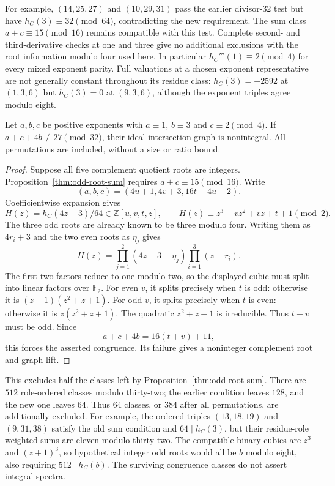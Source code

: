 For example, $(14,25,27)$ and $(10,29,31)$ pass the earlier divisor-$32$
test but have $h_C(3)\equiv32\pmod{64}$, contradicting the new requirement.
The sum class $a+c\equiv15\pmod{16}$ remains compatible with this test.
Complete second- and third-derivative checks at one and three give no
additional exclusions with the root information modulo four used here.
In particular $h_C'''(1)\equiv2\pmod4$ for every mixed exponent parity.
Full valuations at a chosen exponent representative are not generally
constant throughout its residue class: $h_C(3)=-2592$ at $(1,3,6)$ but
$h_C(3)=0$ at $(9,3,6)$, although the exponent triples agree modulo eight.

\begin{proposition}
\label{thm:odd-root-lift}
Let $a,b,c$ be positive exponents with
$a\equiv1$, $b\equiv3$ and $c\equiv2\pmod4$.
If $a+c+4b\not\equiv27\pmod{32}$, their ideal intersection graph is
nonintegral. All permutations are included, without a size or ratio bound.
\end{proposition}

\begin{proof}
Suppose all five complement quotient roots are integers.
Proposition~\ref{thm:odd-root-sum} requires $a+c\equiv15\pmod{16}$.
Write
\[
 (a,b,c)=(4u+1,4v+3,16t-4u-2).
\]
Coefficientwise expansion gives
\[
 H(z)=h_C(4z+3)/64\in\mathbb Z[u,v,t,z],\qquad
 H(z)\equiv z^3+vz^2+vz+t+1\pmod2.
\]
The three odd roots are already known to be three modulo four.
Writing them as $4r_i+3$ and the two even roots as $\eta_j$ gives
\[
 H(z)=\prod_{j=1}^2(4z+3-\eta_j)\prod_{i=1}^3(z-r_i).
\]
The first two factors reduce to one modulo two, so the displayed cubic
must split into linear factors over $\mathbb F_2$.
For even $v$, it splits precisely when $t$ is odd: otherwise it is
$(z+1)(z^2+z+1)$. For odd $v$, it splits precisely when $t$ is even:
otherwise it is $z(z^2+z+1)$. The quadratic $z^2+z+1$ is irreducible.
Thus $t+v$ must be odd. Since
\[
 a+c+4b=16(t+v)+11,
\]
this forces the asserted congruence. Its failure gives a noninteger
complement root and graph lift.
\end{proof}

This excludes half the classes left by Proposition~\ref{thm:odd-root-sum}.
There are $512$ role-ordered classes modulo thirty-two; the earlier
condition leaves $128$, and the new one leaves $64$. Thus $64$ classes,
or $384$ after all permutations, are additionally excluded.
For example, the ordered triples $(13,18,19)$ and $(9,31,38)$ satisfy
the old sum condition and $64\mid h_C(3)$, but their residue-role weighted
sums are eleven modulo thirty-two. The compatible binary cubics are
$z^3$ and $(z+1)^3$, so hypothetical integer odd roots would all be
$b$ modulo eight, also requiring $512\mid h_C(b)$.
The surviving congruence classes do not assert integral spectra.


